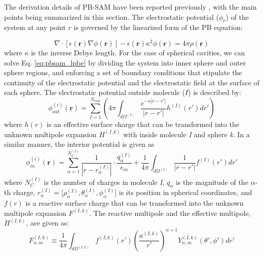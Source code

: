 \documentclass[11pt,titlepage]{article}
\begin{document}
The derivation details of PB-SAM have been reported  previously \cite{yap2010,yap2013}, with the main points being summarized in this section. The electrostatic potential ($\phi_r$) of the system at any point $r$ is governed by the linearized form of the PB equation:

\begin{equation}
\nabla \cdot [ \epsilon(\mathbf{r}) \nabla \phi (\mathbf{r}) ] - \epsilon (\mathbf{r}) \kappa^2 \phi(\mathbf{r}) = 4 \pi \rho(\mathbf{r})
\label{eq:pbsam_lpbe}
\end{equation}
%
where $\kappa$ is the inverse Debye length. For the case of spherical cavities, we can solve Eq. \ref{eq:pbsam_lpbe} by dividing the system into inner sphere and outer sphere regions, and enforcing a set of boundary conditions that stipulate the continuity of the electrostatic potential and the electrostatic field at the surface of each sphere. The electrostatic potential outside molecule ($I$) is described by:
%
\begin{equation}
\phi_{out}^{(i)} (\mathbf{r})  = \sum_{I=1}^{N_{mol}} \left( 4 \pi \int_{d\Omega^{(I)}} \frac{e^{-\kappa | r - r'|}}{|r - r'|} h^{(I)} (r') dr'  \right)
\label{eq:pbsam_phi_in}
\end{equation}
%
where \(h(r)\) is an effective surface charge that can be transformed into the unknown multipole expansion \(H^{(I,k)}\) with inside molecule \textit{I} and sphere \textit{k}. In a similar manner, the interior potential is given as
%
\begin{equation}
\phi_{in}^{(i)} (\mathbf{r})  = \sum_{\alpha = 1}^{N_C^{(I)}} \frac{1}{|r-r_{\alpha}^{(I)}|} \cdot \frac{q_\alpha^{(I)}} {\epsilon_{in}} + \frac{1}{4\pi} \int_{d\Omega^{(I)}} \frac{1}{|r - r'|} f^{(I)} (r') dr' 
\label{eq:pbsam_phi_out}
\end{equation}
%
where \( N_C^{(I)}\) is the number of charges in molecule \textit{I}, \( q_\alpha\) 
is the magnitude of the \(\alpha\)-th charge, \( r_\alpha^{(I)} = \Big[\rho_{\alpha}^{(I)} , \theta_{\alpha}^{(I)} , \phi_{\alpha}^{(I)} \Big]\) is its position in spherical 
coordinates, and \(f(r)\) is a reactive surface charge that can
be transformed into the unknown multipole expansion \(F^{(I,k)}\). The reactive multipole and the effective multipole, \(H^{(I,k)}\), are given as:
%
\begin{equation}
F_{n,m}^{(I,k)} \equiv  \frac{1}{4\pi} \int_{d\Omega^{(I,k)}} f^{(I,k)}(r') \left (  \frac{ a^{(I,k)}}  {r'} \right ) ^{n+1} \overline{ Y^{(I,k)}_{n,m}} (\theta' , \phi') dr'
\label{eq:fmat}
\end{equation}
\end{document}
